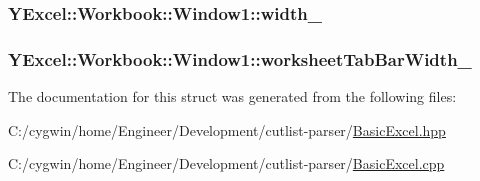 \subsubsection[{width\+\_\+}]{ Y\+Excel\+::\+Workbook\+::\+Window1\+::width\+\_\+}\label{struct_y_excel_1_1_workbook_1_1_window1_ae53e443e115c330f6b62c096f89ac07b}
\hypertarget{struct_y_excel_1_1_workbook_1_1_window1_a0f760500274942653d88dfcbcabc7586}{}
\subsubsection[{worksheet\+Tab\+Bar\+Width\+\_\+}]{ Y\+Excel\+::\+Workbook\+::\+Window1\+::worksheet\+Tab\+Bar\+Width\+\_\+}\label{struct_y_excel_1_1_workbook_1_1_window1_a0f760500274942653d88dfcbcabc7586}


The documentation for this struct was generated from the following files\+:\begin{DoxyCompactItemize}
\item 
C\+:/cygwin/home/\+Engineer/\+Development/cutlist-\/parser/\hyperlink{_basic_excel_8hpp}{Basic\+Excel.\+hpp}\item 
C\+:/cygwin/home/\+Engineer/\+Development/cutlist-\/parser/\hyperlink{_basic_excel_8cpp}{Basic\+Excel.\+cpp}\end{DoxyCompactItemize}
